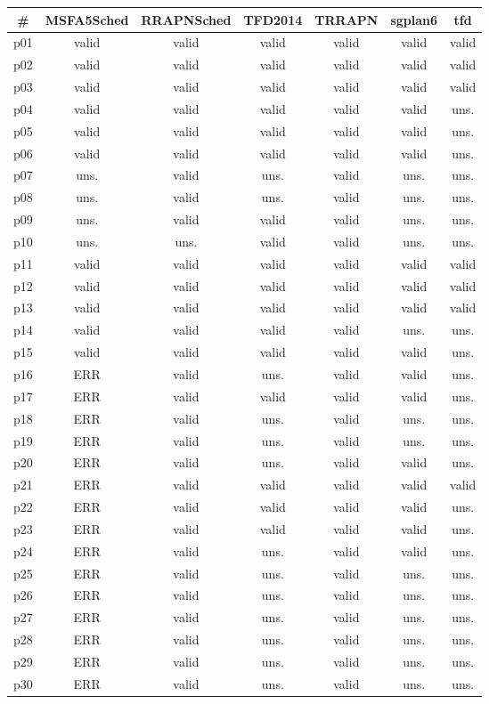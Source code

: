 \begin{tabular}{ccccccc}
\toprule
\textbf{\#} & \textbf{MSFA5Sched} & \textbf{RRAPNSched} & \textbf{TFD2014} & \textbf{TRRAPN} & \textbf{sgplan6} & \textbf{tfd}\\
\midrule
p01 & valid & valid & valid & valid & valid & valid\\
p02 & valid & valid & valid & valid & valid & valid\\
p03 & valid & valid & valid & valid & valid & valid\\
p04 & valid & valid & valid & valid & valid & uns.\\
p05 & valid & valid & valid & valid & valid & uns.\\
p06 & valid & valid & valid & valid & valid & uns.\\
p07 & uns. & valid & uns. & valid & uns. & uns.\\
p08 & uns. & valid & uns. & valid & uns. & uns.\\
p09 & uns. & valid & valid & valid & uns. & uns.\\
p10 & uns. & uns. & valid & valid & uns. & uns.\\
p11 & valid & valid & valid & valid & valid & valid\\
p12 & valid & valid & valid & valid & valid & valid\\
p13 & valid & valid & valid & valid & valid & valid\\
p14 & valid & valid & valid & valid & uns. & uns.\\
p15 & valid & valid & valid & valid & valid & uns.\\
p16 & ERR & valid & uns. & valid & valid & uns.\\
p17 & ERR & valid & valid & valid & valid & uns.\\
p18 & ERR & valid & uns. & valid & uns. & uns.\\
p19 & ERR & valid & uns. & valid & uns. & uns.\\
p20 & ERR & valid & uns. & valid & valid & uns.\\
p21 & ERR & valid & valid & valid & valid & valid\\
p22 & ERR & valid & valid & valid & valid & uns.\\
p23 & ERR & valid & valid & valid & valid & uns.\\
p24 & ERR & valid & uns. & valid & valid & uns.\\
p25 & ERR & valid & uns. & valid & uns. & uns.\\
p26 & ERR & valid & uns. & valid & uns. & uns.\\
p27 & ERR & valid & uns. & valid & uns. & uns.\\
p28 & ERR & valid & uns. & valid & uns. & uns.\\
p29 & ERR & valid & uns. & valid & uns. & uns.\\
p30 & ERR & valid & uns. & valid & uns. & uns.\\
\bottomrule
\end{tabular}

